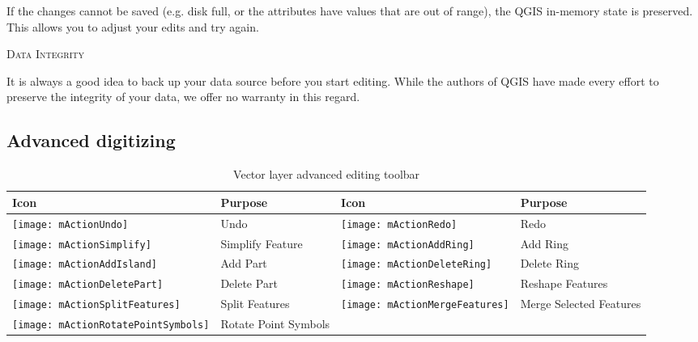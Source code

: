 If the changes cannot be saved (e.g. disk full, or the attributes have
values that are out of range), the QGIS in-memory state is preserved.  This
allows you to adjust your edits and try again.

\begin{Tip}\caption{\textsc{Data Integrity}}
It is always a good idea to back up your data source before you
start
editing. While the authors of QGIS have made every effort to preserve the
integrity of your data, we offer no warranty in this regard.
\end{Tip}

\subsection{Advanced digitizing}
\label{sec:advanced_edit}

\begin{table}[h]
\centering
\caption{Vector layer advanced editing toolbar}\label{tab:advanced_editing}\medskip
\small
\begin{tabular}{|l|p{6.9cm}|l|p{6.9cm}|}
\hline \textbf{Icon} & \textbf{Purpose} & \textbf{Icon} & \textbf{Purpose} \\
\hline \texttt{[image: mActionUndo]}
   & Undo 
   & \texttt{[image: mActionRedo]}
   & Redo \\
\hline \texttt{[image: mActionSimplify]}
   & Simplify Feature
   & \texttt{[image: mActionAddRing]}
   & Add Ring \\
\hline \texttt{[image: mActionAddIsland]}
   & Add Part
   & \texttt{[image: mActionDeleteRing]}
   & Delete Ring \\
\hline \texttt{[image: mActionDeletePart]}
   & Delete Part
   & \texttt{[image: mActionReshape]}
   & Reshape Features \\
\hline \texttt{[image: mActionSplitFeatures]}
   & Split Features
   & \texttt{[image: mActionMergeFeatures]}
   & Merge Selected Features \\
\hline \texttt{[image: mActionRotatePointSymbols]}
   & Rotate Point Symbols
   &
   & \\
\hline
\end{tabular}
\end{table}


